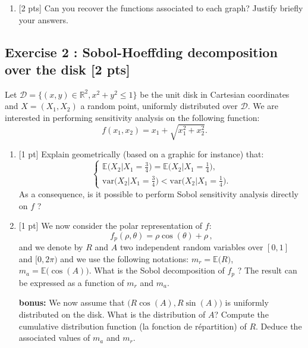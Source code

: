 \documentclass[a4paper,10pt]{article}
\newcommand{\Disk}{\mathcal{D}}
\begin{document}
\noindent
\begin{enumerate}[label=Q\arabic*.]
  \item {[2 pts]} Can you recover the functions associated to each graph? Justify briefly your answers.
\end{enumerate}

\newpage
\subsection*{Exercise 2 : Sobol-Hoeffding decomposition over the disk \hfill [2 pts]}

Let $\Disk = \lbrace\left( x, y \right) \in \mathbb{R}^2, x^2 + y^2 \leq 1\rbrace$ be the unit disk in Cartesian coordinates and $X = \left(X_1, X_2\right)$ a random point, uniformly distributed over $\Disk$. We are interested in performing sensitivity analysis on the following function:
\begin{equation*}
  f(x_1,x_2) = x_1 + \sqrt{x_1^2 + x_2^2}.
\end{equation*}

\begin{enumerate}[label=Q\arabic*.]
\item {[1 pt]} Explain geometrically (based on a graphic for instance) that:
\begin{equation*}
  \begin{cases}
  \mathbb{E} \big(X_2 \vert X_1 = \frac{3}{4} \big) = \mathbb{E} \big(X_2 \vert X_1 = \frac{1}{4}  \big), \\
  \mathrm{var} \big(X_2 \vert X_1=\frac{3}{4} \big) < \mathrm{var} \big(X_2 \vert X_1 = \frac{1}{4}\big). 
  \end{cases}
\end{equation*}
As a consequence, is it possible to perform Sobol sensitivity analysis directly on $f$ ? 
\item {[1 pt]} We now consider the polar representation of $f$:
\begin{equation*}
  f_p(\rho,\theta) = \rho \cos(\theta) + \rho \, ,
\end{equation*}
and we denote by $R$ and $A$ two independent random variables over $[0, 1]$ and $[0, 2\pi)$ and we use the following notations: 
$m_r = \mathbb{E} \big(R\big)$, $m_a = \mathbb{E} \big(\cos(A) \big)$. What is the Sobol decomposition of $ f_p$ ? The result can be expressed as a function of $m_r $ and $m_a$. 
\item[\textbf{bonus:}] We now assume that $\big(R \cos(A), R \sin(A) \big)$ is uniformly distributed on the disk. What is the distribution of $A$? Compute the cumulative distribution function (la fonction de répartition) of $R$. Deduce the associated values of $m_a$ and $m_r$.
\end{enumerate}
\end{document}
